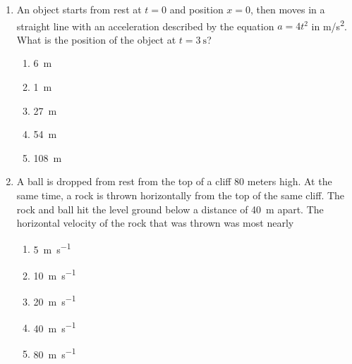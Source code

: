 \documentclass{../../../oss-classkick}
\begin{document}
\begin{multicols*}{2}
\begin{enumerate}[resume,leftmargin=18pt]
\begin{enumerate}[nosep,leftmargin=18pt,label=(\Alph*)]
    \end{enumerate}
  \item An object starts from rest at $t=0$ and position $x=0$, then moves in a
    straight line with an acceleration described by the equation $a=4t^2$ in
    \si{m/s^2}. What is the position of the object at $t=\SI{3}{\second}$?
    \begin{enumerate}[nosep,leftmargin=18pt,label=(\Alph*)]
    \item\SI{6}{\metre}
    \item\SI{1}{\metre}
    \item\SI{27}{\metre}
    \item\SI{54}{\metre}
    \item\SI{108}{\metre}
    \end{enumerate}
    
  \item A ball is dropped from rest from the top of a cliff $80$ meters high. At
    the same time, a rock is thrown horizontally from the top of the same
    cliff. The rock and ball hit the level ground below a distance of
    \SI{40}{\metre} apart. The horizontal velocity of the rock that was thrown
    was most nearly
    \begin{center}
      \vspace{-.15in}
    \end{center}
    \begin{enumerate}[nosep,leftmargin=18pt,label=(\Alph*)]
    \item\SI{5}{\metre\per\second}
    \item\SI{10}{\metre\per\second}
    \item\SI{20}{\metre\per\second}
    \item\SI{40}{\metre\per\second}
    \item\SI{80}{\metre\per\second}
    \end{enumerate}
    

\end{enumerate}
\end{multicols*}
\end{document}
